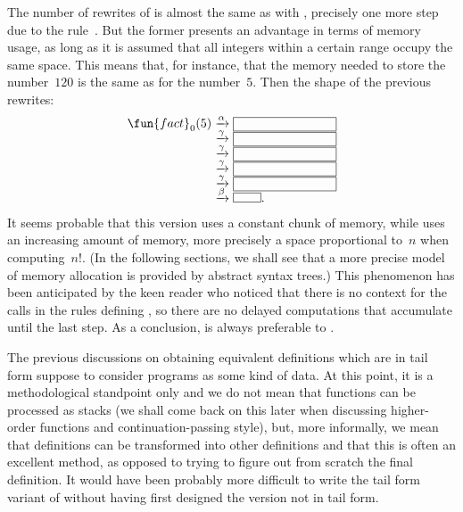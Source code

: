 The number of rewrites of  is almost the same as
with , precisely one more step due to the
rule~\clause{\alpha}. But the former presents an advantage in terms of
memory usage, as long as it is assumed that all integers within a
certain range occupy the same space. This means that, for instance,
that the memory needed to store the number~\(120\) is the same as for
the number~\(5\). Then the shape of the previous rewrites:
\begin{equation*}
\setlength\fboxsep{0mm}
\begin{array}{r@{\;}c@{\;}l}
\fun{fact}_0(5)
& \xrightarrow{\smash[t]{\alpha}} &
\fbox{\phantom{$\fun{fact}_0(0,10)$}}\\
& \xrightarrow{\smash[t]{\gamma}} &
\fbox{\phantom{$\fun{fact}_0(0,10)$}}\\
& \xrightarrow{\smash[t]{\gamma}} &
\fbox{\phantom{$\fun{fact}_0(0,10)$}}\\
& \xrightarrow{\smash[t]{\gamma}} &
\fbox{\phantom{$\fun{fact}_0(0,10)$}}\\
& \xrightarrow{\smash[t]{\gamma}} &
\fbox{\phantom{$\fun{fact}_0(0,10)$}}\\
& \xrightarrow{\smash[t]{\beta}} & \fbox{\phantom{CCC}}.
\end{array}
\end{equation*}
It seems probable that this version uses a constant chunk of memory,
while  uses an increasing amount of memory, more precisely
a space proportional to~\(n\) when computing~\(n!\). (In the following
sections, we shall see that a more precise model of memory allocation
is provided by abstract syntax trees.) This phenomenon has been
anticipated by the keen reader who noticed that there is no context
for the calls in the rules defining , so there are
no delayed computations that accumulate until the last step. As a
conclusion,  is always preferable to .

The previous discussions on obtaining equivalent definitions which are
in tail form suppose to consider programs as some kind of data. At
this point, it is a methodological standpoint only and we do not mean
that functions can be processed as stacks (we shall come back on this
later when discussing higher\hyp{}order functions and
continuation\hyp{}passing style), but, more informally, we mean that
definitions can be transformed into other definitions and that this is
often an excellent method, as opposed to trying to figure out from
scratch the final definition. It would have been probably more
difficult to write the tail form variant of  without having
first designed the version not in tail form.

